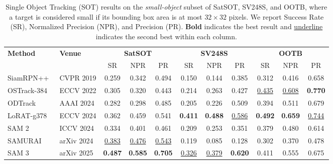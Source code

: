 \begin{table}[t]
\centering
\caption{Single Object Tracking (SOT) results on the \emph{small-object} subset of
SatSOT, SV248S, and OOTB, where a target is considered small if its bounding box
area is at most $32 \times 32$ pixels. We report Success Rate (SR),
Normalized Precision (NPR), and Precision (PR).
\textbf{Bold} indicates the best result and \underline{underline} indicates the
second best within each column.}
\label{tab:sot_results_small}
\setlength{\tabcolsep}{4pt}
\renewcommand{\arraystretch}{1.15}
\begin{tabular}{l l ccc ccc ccc}
\toprule
\multirow{2}{*}{\textbf{Method}} & \multirow{2}{*}{\textbf{Venue}} 
 & \multicolumn{3}{c}{\textbf{SatSOT}}
 & \multicolumn{3}{c}{\textbf{SV248S}}
 & \multicolumn{3}{c}{\textbf{OOTB}} \\
\cmidrule(lr){3-5} \cmidrule(lr){6-8} \cmidrule(lr){9-11}
& & SR & NPR & PR & SR & NPR & PR & SR & NPR & PR \\
\midrule
SiamRPN++~\cite{li2019siamrpn++}    & CVPR 2019   & 0.259             & 0.342             & 0.494             & 0.150             & 0.144             & 0.385             & 0.312             & 0.416             & 0.658             \\
OSTrack-384~\cite{ye2022joint}  & ECCV 2022   & 0.305             & 0.320             & 0.443             & 0.214             & 0.263             & 0.427             & \underline{0.435} & \underline{0.608} & \textbf{0.770}    \\
ODTrack~\cite{zheng2024odtrack}      & AAAI 2024  & 0.282             & 0.298             & 0.485             & 0.205             & 0.226             & 0.509             & 0.394             & 0.511             & 0.679             \\
LoRAT-g378~\cite{lin2024tracking}   & ECCV 2024   & 0.362             & 0.459             & 0.541             & \textbf{0.411}    & \textbf{0.488}    & \underline{0.586} & \textbf{0.492}    & \textbf{0.659}    & \underline{0.744} \\
SAM 2~\cite{ravi2024sam}        & ICCV 2024  & 0.334             & 0.401             & 0.461             & 0.209             & 0.253             & 0.351             & 0.379             & 0.480             & 0.614             \\
SAMURAI~\cite{yang2026samurai}      & arXiv 2024  & \underline{0.383} & \underline{0.476} & \underline{0.543} & 0.119             & 0.085             & 0.128             & 0.302             & 0.370             & 0.478             \\
SAM 3~\cite{carion2026sam3}        & arXiv 2025  & \textbf{0.487}    & \textbf{0.585}    & \textbf{0.705}    & \underline{0.326} & \underline{0.379} & \textbf{0.620}    & 0.411             & 0.555             & 0.675             \\
\bottomrule
\end{tabular}
\end{table}
